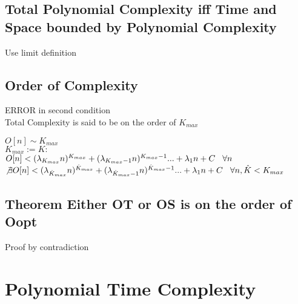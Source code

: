 \documentclass[11pt]{article}
\begin{document}
\subsection{Total Polynomial Complexity iff Time and Space bounded by Polynomial Complexity}
Use limit definition













\subsection{Order of Complexity}
ERROR in second condition\\
Total Complexity is said to be on the order of $K_{max}$
\begin{center}
$
O[n] \sim K_{max}
$
\\ \vspace{2mm}
$
K_{max} := K :
$
\\ \vspace{2mm}
$
O[n] < (\lambda_{K_{max}} n)^{K_{max}} + (\lambda_{K_{max}-1} n)^{K_{max}-1}... + \lambda_1 n + C \hspace{3mm} \forall n
$
\\ \vspace{2mm}
$
\not \exists O[n] < (\lambda_{\hat{K}_{max}} n)^{\hat{K}_{max}} + (\lambda_{\hat{K}_{max}-1} n)^{\hat{K}_{max}-1}... + \lambda_1 n + C \hspace{3mm} \forall n,\hat{K} < K_{max}
$
\end{center}





\subsection{Theorem Either OT or OS is on the order of Oopt}
Proof by contradiction








\newpage
\section{Polynomial Time Complexity}
\end{document}
